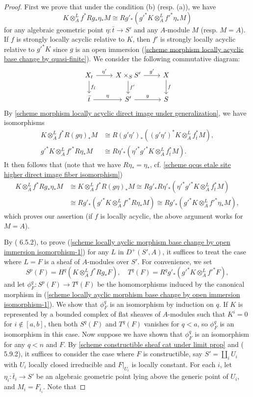 \begin{proof}
First we prove that under the condition (b) (resp. (a)), we have
\[K\otimes_A^Lf^*Rg_*\eta_*M\cong Rg'_*(g'^*K\otimes_A^Lf'^*\eta_*M)\]
for any algebraic geometric point $\eta:\bar{t}\to S'$ and any $A$-module $M$ (resp. $M=A$). If $f$ is strongly locally acyclic relative to $K$, then $f'$ is strongly locally acyclic relative to $g'^*K$ since $g$ is an open immersion (\cref{scheme morphism locally acyclic base change by quasi-finite}). We consider the following commutative diagram:
\[\begin{tikzcd}
X_t\ar[r,"\eta'"]\ar[d,"f_{\bar{t}}"]&X\times_SS'\ar[r,"g'"]\ar[d,"f'"]&X\ar[d,"f"]\\
\bar{t}\ar[r,"\eta"]&S'\ar[r,"g"]&S
\end{tikzcd}\]
By \cref{scheme morphism locally acyclic direct image under generalization}, we have isomorphisms
\begin{align*}
K\otimes_A^Lf^*R(g\eta)_*M&\cong R(g'\eta')_*((g'\eta')^*K\otimes_A^Lf_{\bar{t}}^*M),\\
g'^*K\otimes_A^Lf'^*R\eta_*M&\cong R\eta'_*(\eta'^*g'^*K\otimes_A^Lf_{\bar{t}}^*M).
\end{align*}
It then follows that (note that we have $R\eta_*=\eta_*$, cf. \cref{scheme qcqs etale site higher direct image fiber isomorphism})
\begin{align*}
K\otimes_A^Lf^*Rg_*\eta_*M&\cong K\otimes_A^Lf^*R(g\eta)_*M\cong Rg'_*R\eta'_*(\eta'^*g'^*K\otimes_A^Lf_{\bar{t}}^*M)\\
&\cong Rg'_*(g'^*K\otimes_A^Lf'^*R\eta_*M)\cong Rg'_*(g'^*K\otimes_A^Lf'^*\eta_*M),
\end{align*}
which proves our assertion (if $f$ is locally acyclic, the above argument works for $M=A$).\par
By (\cite{Fulei} 6.5.2), to prove (\ref{scheme locally ayclic morphism base change by open immersion isomorphism-1}) for any $L$ in $D^+(S',A)$, it suffices to treat the case where $L=F$ is a sheaf of $A$-modules over $S'$. For convenience, we set
\[S^p(F)=H^q(K\otimes_A^Lf^*Rg_*F),\quad T^q(F)=R^qg'_*(g'^*K\otimes_A^Lf'^*F),\]
and let $\phi_F^q:S^p(F)\to T^q(F)$ be the homomorphisms induced by the canonical morphism in (\ref{scheme locally ayclic morphism base change by open immersion isomorphism-1}). We show that $\phi^q_F$ is an isomorphism by induction on $q$. If $K$ is represented by a bounded complex of flat sheaves of $A$-modules such that $K^i=0$ for $i\notin[a,b]$, then both $S^q(F)$ and $T^q(F)$ vanishes for $q<a$, so $\phi^q_F$ is an isomorphism in this case. Now suppose we have shown that $\phi^q_F$ is an isomorphism for any $q<n$ and $F$. By \cref{scheme constructible sheaf cat under limit prop} and (\cite{Fulei} 5.9.2), it suffices to consider the case where $F$ is constructible, say $S'=\amalg_iU_i$ with $U_i$ locally closed irreducible and $F|_{U_i}$ is locally constant. For each $i$, let $\eta_i:\bar{t}_i\to S'$ be an algebraic geometric point lying above the generic point of $U_i$, and $M_i=F_{\bar{t}_i}$. Note that

\end{proof}

